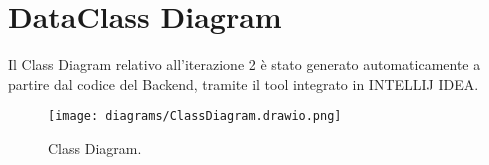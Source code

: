 \section{DataClass Diagram} 
Il Class Diagram relativo all'iterazione 2 è stato generato automaticamente a partire dal codice del Backend, tramite il tool 
integrato in INTELLIJ IDEA.
\begin{figure}[h!]
	\centering
	\texttt{[image: diagrams/ClassDiagram.drawio.png]}
	\caption{Class Diagram.}
	\label{fig:ComponentDiagram}
\end{figure}
